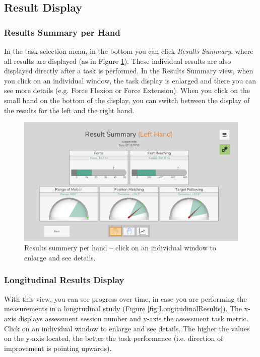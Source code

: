 \documentclass[10pt,oneside,a4paper]{article}
\begin{document}
\subsection{Result Display}
\subsubsection{Results Summary per Hand}
In the task selection menu, in the bottom you can click \emph{Results Summary}, where all results are displayed (as in Figure \ref{fig:ResultSummaryHand}). These individual results are also displayed directly after a task is performed. In the Results Summary view, when you click on an individual window, the task display is enlarged and there you can see more details (e.g. Force Flexion or Force Extension). When you click on the small hand on the bottom of the display, you can switch between the display of the results for the left and the right hand. 

\begin{figure}[h!]
\begin{center}
\includegraphics[width=\columnwidth]{images/Assessments/ResultsSummary.png}
\caption{Results summery per hand – click on an individual window to enlarge and see details.}
\label{fig:ResultSummaryHand}
\end{center}
\end{figure}

\subsubsection{Longitudinal Results Display}
With this view, you can see progress over time, in case you are performing the measurements in a longitudinal study (Figure \ref{fig:LongitudinalResults}). The x-axis displays assessment session number and y-axis the assessment task metric. Click on an individual window to enlarge and see details. The higher the values on the y-axis located, the better the task performance (i.e. direction of improvement is pointing upwards).  
\end{document}
